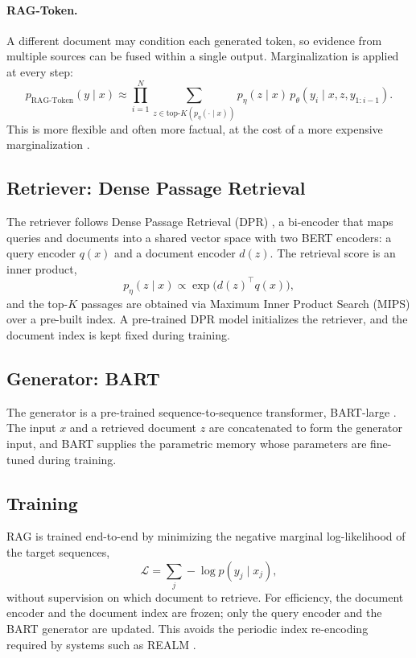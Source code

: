 \documentclass[12pt,a4paper,titlepage,oneside]{book}
\begin{document}
\paragraph{RAG-Token.} A different document may condition each generated token, so evidence from multiple sources can be fused within a single output. Marginalization is applied at every step:
\begin{equation}
p_{\text{RAG-Token}}(y \mid x) \approx \prod_{i=1}^{N} \sum_{z \in \text{top-}K(p_{\eta}(\cdot \mid x))} p_{\eta}(z \mid x)\, p_{\theta}(y_i \mid x, z, y_{1:i-1}).
\end{equation}
This is more flexible and often more factual, at the cost of a more expensive marginalization \cite{lewis2020rag}.

\subsection{Retriever: Dense Passage Retrieval}
The retriever follows Dense Passage Retrieval (DPR) \cite{karpukhin2020dpr}, a bi-encoder that maps queries and documents into a shared vector space with two BERT encoders: a query encoder $q(x)$ and a document encoder $d(z)$. The retrieval score is an inner product,
\begin{equation}
p_{\eta}(z \mid x) \propto \exp\!\big(d(z)^{\top} q(x)\big),
\end{equation}
and the top-$K$ passages are obtained via Maximum Inner Product Search (MIPS) over a pre-built index. A pre-trained DPR model initializes the retriever, and the document index is kept fixed during training.

\subsection{Generator: BART}
The generator is a pre-trained sequence-to-sequence transformer, BART-large \cite{lewis2019bart}. The input $x$ and a retrieved document $z$ are concatenated to form the generator input, and BART supplies the parametric memory whose parameters are fine-tuned during training.

\subsection{Training}
RAG is trained end-to-end by minimizing the negative marginal log-likelihood of the target sequences,
\begin{equation}
\mathcal{L} = \sum_{j} -\log p(y_j \mid x_j),
\end{equation}
without supervision on which document to retrieve. For efficiency, the document encoder and the document index are frozen; only the query encoder and the BART generator are updated. This avoids the periodic index re-encoding required by systems such as REALM \cite{guu2020realm}.
\end{document}
